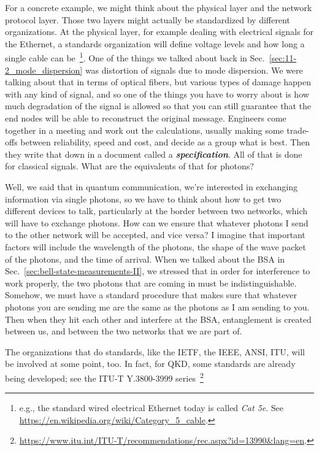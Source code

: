 For a concrete example, we might think about the physical layer and the network protocol layer. Those two layers might actually be standardized by different organizations. At the physical layer, for example dealing with electrical signals for the Ethernet, a standards organization will define voltage levels and how long a single cable can be~\footnote{e.g., the standard wired electrical Ethernet today is called \emph{Cat 5e}. See \url{https://en.wikipedia.org/wiki/Category_5_cable}.}. One of the things we talked about back in Sec.~\ref{sec:11-2_mode_dispersion} was distortion of signals due to mode dispersion. We were talking about that in terms of optical fibers, but various types of damage happen with any kind of signal, and so one of the things you have to worry about is how much degradation of the signal is allowed so that you can still guarantee that the end nodes will be able to reconstruct the original message. Engineers come together in a meeting and work out the calculations, usually making some trade-offs between reliability, speed and cost, and decide as a group what is best. Then they write that down in a document called a \textbf{\emph{specification}}. All of that is done for classical signals. What are the equivalents of that for photons?

\mmm Well, we said that in quantum communication, we're interested in exchanging information via single photons, so we have to think about how to get two different devices to talk, particularly at the border between two networks, which will have to exchange photons. How can we ensure that whatever photons I send to the other network will be accepted, and vice versa? I imagine that important factors will include the wavelength of the photons, the shape of the wave packet of the photons, and the time of arrival. When we talked about the BSA in Sec.~\ref{sec:bell-state-measurements-II}, we stressed that in order for interference to work properly, the two photons that are coming in must be indistinguishable. Somehow, we must have a standard procedure that makes sure that whatever photons you are sending me are the same as the photons as I am sending to you. Then when they hit each other and interfere at the BSA, entanglement is created between us, and between the two networks that we are part of.

\rrr The organizations that do standards, like the IETF, the IEEE, ANSI, ITU, will be involved at some point, too. In fact, for QKD, some standards are already being developed; see the ITU-T Y.3800-3999 series~\footnote{\url{https://www.itu.int/ITU-T/recommendations/rec.aspx?id=13990&lang=en}.}

